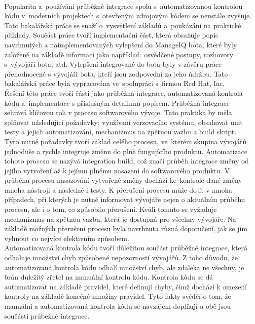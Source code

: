 \\
Popularita a~používání průběžné integrace spolu s~automatizovanou kontrolou kódu v~mo\-derních projektech s~otevřeným zdrojovým kódem se neustále zvyšuje. Tato bakalářská práce se snaží o~vysvětlení základů a~poukázání na praktické příklady. Součást práce tvoří implementační část, která obsahuje popis navrhnutých a naimplementovaných vylepšení do ManageIQ bota, které byly založené na základě informací jako například: osvědčené postupy, rozhovory s~vývojáři bota, atd. Vylepšení integrované do bota byly v závěru práce přehodnocené s vývojáři bota, kteří jsou zodpovední za jeho údržbu. Tato bakalářská práce byla vypracována ve~spolupráci s~firmou Red Hat, Inc.\\[0.5em]
\indent Řešení této práce tvoří části jako průběžná integrace, automatizovaná kontrola kódu a~implementace s příslušným detailním popisem. Průběžná integrace sehrává klíčovou roli v procesu softwarového vývoje. Tato praktika by měla splňovat následující požadavky: využívaní verzovacího systému, obsahovat unit testy a jejich automatizování, mechanizmus na zpětnou vazbu a build skript. Tyto nutné požadavky tvoří základ celého procesu, ve~kterém skupina vývojářů jednoduše a rychle integruje změnu do plně fungujícího produktu. Automatizace tohoto procesu se nazývá integration build, což značí průběh integrace změny od jejího vytvoření až k jejímu plnému nasazení do softwarového produktu. V průběhu procesu nasazování vytvořené změny dochází ke~kontrole dané změny mnoha nástroji a následně i testy. K přerušení procesu může dojít v mnoha případech, při kterých je nutné informovat vývojáře nejen o aktuálním průběhu procesu, ale i o tom, co způsobilo přerušení. Kvůli tomuto se vyžaduje mechanizmus na zpětnou vazbu, která je dostupná pro všechny vývojáře. Na základě možných přerušení procesu byla navrhnuta různá doporučení, jak se jim vyhnout co nejvíce efektivním způsobem.\\[0.5em]
\indent Automatizovaná kontrola kódu tvoří důležitou součást průběžné integrace, která odhaluje množství chyb způsobené nepozorností vývojářů. Z toho důvodu, že automatizovaná kontrola kódu odhalí množství chyb, ale zdaleka ne všechny, je brán důležitý zřetel na manuální kontrolu kódu. Kontrola kódu se dá automatizovat na základě pravidel, které definují chyby, čímž dochází k omezení kontroly na základě konečné množiny pravidel. Tyto fakty svědčí o tom, že manuální a automatizovaná kontrola kódu se navzájem doplňují a obě jsou součástí průbežné integrace.\\[0.5em]
